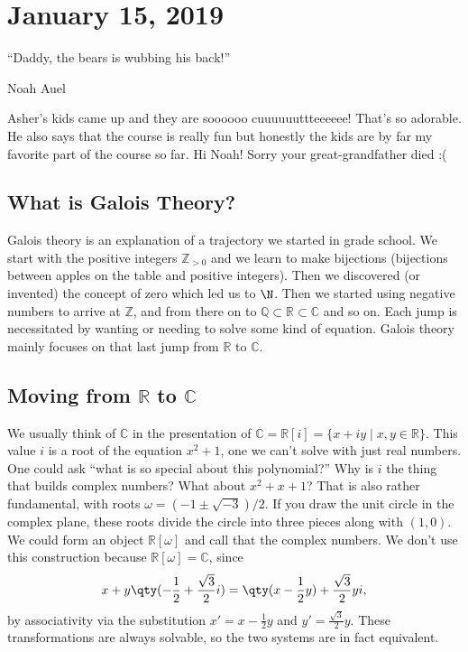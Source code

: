 
\section{January 15, 2019}

\epigraph{``Daddy, the bears is wubbing his back!''}{Noah Auel}

Asher's kids came up and they are soooooo cuuuuuuttteeeeee! That's so adorable. He also says that the course is really fun but honestly the kids are by far my favorite part of the course so far. Hi Noah! Sorry your great-grandfather died :(

\subsection{What is Galois Theory?}

Galois theory is an explanation of a trajectory we started in grade school. We start with the positive integers $\mathbb{Z}_{>0}$ and we learn to make bijections (bijections between apples on the table and positive integers). Then we discovered (or invented) the concept of zero which led us to $\N$. Then we started using negative numbers to arrive at $\mathbb{Z}$, and from there on to $\mathbb{Q} \subset \mathbb{R} \subset \mathbb{C}$ and so on. Each jump is necessitated by wanting or needing to solve some kind of equation. Galois theory mainly focuses on that last jump from $\mathbb{R}$ to $\mathbb{C}$.

\subsection{Moving from \texorpdfstring{$\mathbb{R}$ to $\mathbb{C}$}{R to C}}

We usually think of $\mathbb{C}$ in the presentation of $\mathbb{C} = \mathbb{R}[i] = \{x+iy \mid x,y \in \mathbb{R}\}$. This value $i$ is a root of the equation $x^2+1$, one we can't solve with just real numbers. One could ask ``what is so special about this polynomial?'' Why is $i$ the thing that builds complex numbers? What about $x^2 + x + 1$? That is also rather fundamental, with roots $\omega = (-1 \pm \sqrt{-3})/2$. If you draw the unit circle in the complex plane, these roots divide the circle into three pieces along with $(1,0)$. We could form an object $\mathbb{R}[\omega]$ and call that the complex numbers. We don't use this construction because $\mathbb{R}[\omega] = \mathbb{C}$, since 
\[ x + y\qty(-\frac{1}{2} + \frac{\sqrt{3}}{2}i) = \qty(x-\frac{1}{2}y) + \frac{\sqrt{3}}{2}yi, \]
by associativity via the substitution $x' = x-\frac{1}{2}y$ and $y' = \frac{\sqrt{3}}{2}y$. These transformations are always solvable, so the two systems are in fact equivalent.

